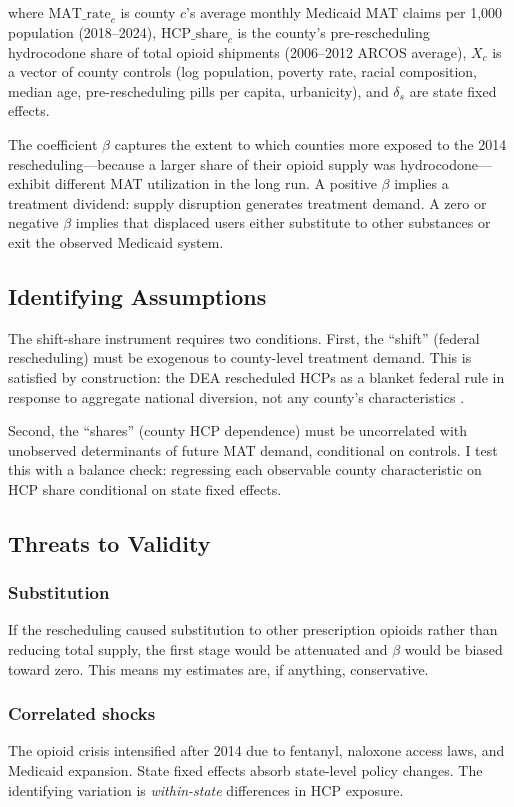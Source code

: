 \documentclass[12pt]{article}
\begin{document}
where $\text{MAT\_rate}_c$ is county $c$'s average monthly Medicaid MAT claims per 1,000 population (2018--2024), $\text{HCP\_share}_c$ is the county's pre-rescheduling hydrocodone share of total opioid shipments (2006--2012 ARCOS average), $X_c$ is a vector of county controls (log population, poverty rate, racial composition, median age, pre-rescheduling pills per capita, urbanicity), and $\delta_s$ are state fixed effects.

The coefficient $\beta$ captures the extent to which counties more exposed to the 2014 rescheduling---because a larger share of their opioid supply was hydrocodone---exhibit different MAT utilization in the long run. A positive $\beta$ implies a treatment dividend: supply disruption generates treatment demand. A zero or negative $\beta$ implies that displaced users either substitute to other substances or exit the observed Medicaid system.

\subsection{Identifying Assumptions}

The shift-share instrument requires two conditions. First, the ``shift'' (federal rescheduling) must be exogenous to county-level treatment demand. This is satisfied by construction: the DEA rescheduled HCPs as a blanket federal rule in response to aggregate national diversion, not any county's characteristics \citep{jones2014hydrocodone}.

Second, the ``shares'' (county HCP dependence) must be uncorrelated with unobserved determinants of future MAT demand, conditional on controls. I test this with a balance check: regressing each observable county characteristic on HCP share conditional on state fixed effects.

\subsection{Threats to Validity}

\subsubsection*{Substitution}  If the rescheduling caused substitution to other prescription opioids rather than reducing total supply, the first stage would be attenuated and $\beta$ would be biased toward zero. This means my estimates are, if anything, conservative.

\subsubsection*{Correlated shocks}  The opioid crisis intensified after 2014 due to fentanyl, naloxone access laws, and Medicaid expansion. State fixed effects absorb state-level policy changes. The identifying variation is \textit{within-state} differences in HCP exposure.
\end{document}
